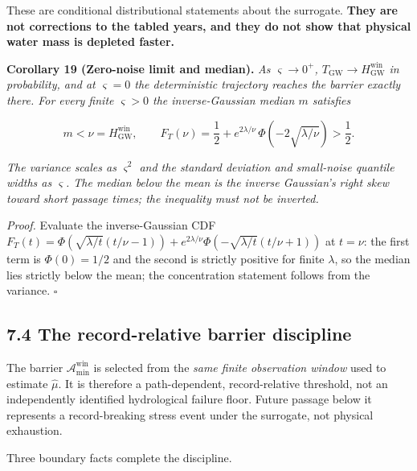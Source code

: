 \documentclass[11pt]{article}
\begin{document}
These are conditional distributional statements about the surrogate. \textbf{They are not corrections to the tabled years, and they do not show that physical water mass is depleted faster.}

\textbf{Corollary 19 (Zero-noise limit and median).} \emph{As \(\varsigma \to 0^+\), \(T_{\mathrm{GW}} \to H^{\mathrm{win}}_{\mathrm{GW}}\) in probability, and at \(\varsigma = 0\) the deterministic trajectory reaches the barrier exactly there. For every finite \(\varsigma > 0\) the inverse-Gaussian median \(m\) satisfies} 

$$m < \nu = H^{\mathrm{win}}_{\mathrm{GW}}, \qquad F_T(\nu) = \frac{1}{2} + e^{2\lambda/\nu}\,\Phi\!\left( -2\sqrt{\lambda/\nu} \right) > \frac{1}{2}.$$

 \emph{The variance scales as \(\varsigma^2\) and the standard deviation and small-noise quantile widths as \(\varsigma\). The median below the mean is the inverse Gaussian's right skew toward short passage times; the inequality must not be inverted.}

\emph{Proof.} Evaluate the inverse-Gaussian CDF \(F_T(t) =\allowbreak{} \Phi(\sqrt{\lambda/\allowbreak{}t}(t/\nu - 1)) +\allowbreak{} e^{2\lambda/\nu}\Phi(-\sqrt{\lambda/\allowbreak{}t}(t/\nu +\allowbreak{} 1))\) at \(t = \nu\): the first term is \(\Phi(0) = 1/\allowbreak{}2\) and the second is strictly positive for finite \(\lambda\), so the median lies strictly below the mean; the concentration statement follows from the variance. \(\square\)

\subsection*{7.4 The record-relative barrier discipline}\label{74-the-record-relative-barrier-discipline}

The barrier \(\mathcal A^{\mathrm{win}}_{\min}\) is selected from the \emph{same finite observation window} used to estimate \(\hat\mu\). It is therefore a path-dependent, record-relative threshold, not an independently identified hydrological failure floor. Future passage below it represents a record-breaking stress event under the surrogate, not physical exhaustion.

Three boundary facts complete the discipline.
\end{document}
